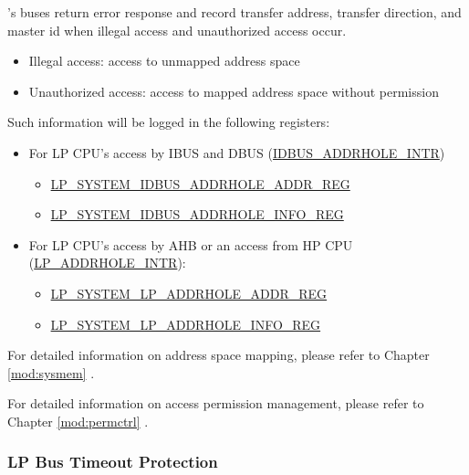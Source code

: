 \documentclass[main\_\_EN.tex]{subfiles}
\begin{document}
\chipname{}'s buses return error response and record transfer address, transfer direction, and master id when illegal access and unauthorized access occur.

\begin{itemize}
    \item Illegal access: access to unmapped address space
    \item Unauthorized access: access to mapped address space without permission
\end{itemize}

Such information will be logged in the following registers:

\begin{itemize}
    \item For LP CPU's access by IBUS and DBUS (\hyperref[tab:sysreg-int-sources]{IDBUS\_ADDRHOLE\_INTR})
        \begin{itemize}
            \item \hyperref[regdesc:LPSYSTEMIDBUSADDRHOLEADDRREG]{LP\_SYSTEM\_IDBUS\_ADDRHOLE\_ADDR\_REG}\\
            \item \hyperref[regdesc:LPSYSTEMIDBUSADDRHOLEINFOREG]{LP\_SYSTEM\_IDBUS\_ADDRHOLE\_INFO\_REG}\\
        \end{itemize}
    \item For LP CPU's access by AHB or an access from HP CPU (\hyperref[tab:sysreg-int-sources]{LP\_ADDRHOLE\_INTR}):
        \begin{itemize}
            \item \hyperref[regdesc:LPSYSTEMLPADDRHOLEADDRREG]{LP\_SYSTEM\_LP\_ADDRHOLE\_ADDR\_REG}\\
            \item \hyperref[regdesc:LPSYSTEMLPADDRHOLEINFOREG]{LP\_SYSTEM\_LP\_ADDRHOLE\_INFO\_REG}\\
        \end{itemize}
\end{itemize}

For detailed information on address space mapping, please refer to Chapter \ref{mod:sysmem} \textit{}.

For detailed information on access permission management, please refer to Chapter \ref{mod:permctrl} \textit{}.


\subsubsection{LP Bus Timeout Protection}
\end{document}
